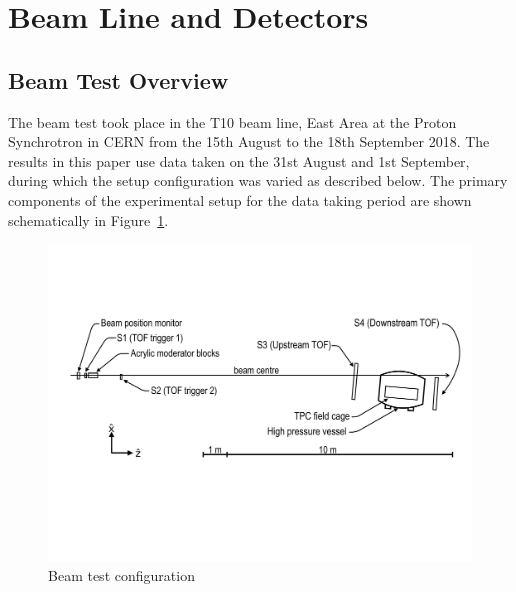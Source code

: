 \section{Beam Line and Detectors}
\label{hptpcPaper:sec:Methods}

\subsection{Beam Test Overview}
The beam test took place in the T10 beam line, East Area at the Proton Synchrotron in CERN from the 15th August to the 18th September 2018.
The results in this paper use data taken on the 31st August and 1st September, during which the setup configuration was varied as described below.
The primary components of the  experimental setup for the data taking period are shown schematically in Figure~\ref{fig:setup}.

\begin{figure}
  \includegraphics[width=1.0\linewidth]{files/Figures/hptpc_t10_planview.pdf}
  \caption{Beam test configuration}
  \label{fig:setup}
\end{figure}

